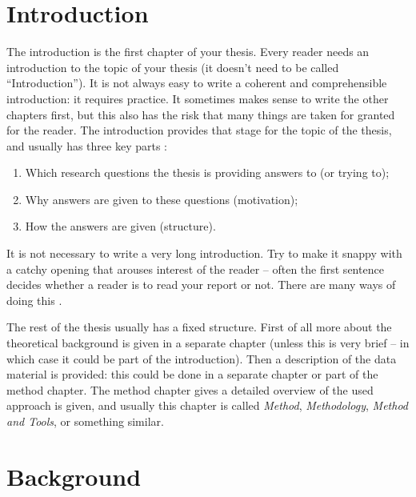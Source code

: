 \documentclass[
10pt, %
a4paper, %
oneside, %
headinclude,footinclude, %
] {book}%
\begin{document}

\chapter{Introduction}

The introduction is the first chapter of your thesis. Every reader
needs an introduction to the topic of your thesis (it doesn't need to
be called ``Introduction''). It is not always easy to write a coherent
and comprehensible introduction: it requires practice. It sometimes
makes sense to write the other chapters first, but this also has the
risk that many things are taken for granted for the reader.  The
introduction provides that stage for the topic of the thesis, and
usually has three key parts \citep{Nederhoed:2010}:

\begin{enumerate}
\item Which research questions the thesis is providing answers to (or trying to);
\item Why answers are given to these questions (motivation);
\item How the answers are given (structure).
\end{enumerate}

It is not necessary to write a very long introduction. Try to make it
snappy with a catchy opening that arouses interest of the reader --
often the first sentence decides whether a reader is to read your
report or not. There are many ways of doing this \citep{Nederhoed:2010}.

The rest of the thesis usually has a fixed structure. First of all
more about the theoretical background is given in a separate chapter
(unless this is very brief -- in which case it could be part of the
introduction). Then a description of the data material is provided:
this could be done in a separate chapter or part of the method
chapter. The method chapter gives a detailed overview of the used
approach is given, and usually this chapter is called \textit{Method},
\textit{Methodology}, \textit{Method and Tools}, or something similar.




\chapter{Background}
\end{document}
